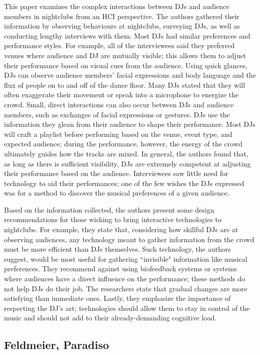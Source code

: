 This paper examines the complex interactions between DJs and audience members in nightclubs from an HCI perspective. The authors gathered their information by observing behaviours at nightclubs, surveying DJs, as well as conducting lengthy interviews with them. Most DJs had similar preferences and performance styles. For example, all of the interviewees said they preferred venues where audience and DJ are mutually visible; this allows them to adjust their performance based on visual cues from the audience. Using quick glances, DJs can observe audience members' facial expressions and body language and the flux of people on to and off of the dance floor. Many DJs stated that they will often exaggerate their movement or speak into a microphone to energize the crowd. Small, direct interactions can also occur between DJs and audience members, such as exchanges of facial expressions or gestures. DJs use the information they glean from their audience to shape their performance. Most DJs will craft a playlist before performing based on the venue, event type, and expected audience; during the performance, however, the energy of the crowd ultimately guides how the tracks are mixed. In general, the authors found that, as long as there is sufficient visibility, DJs are extremely competent at adjusting their performance based on the audience. Interviewees saw little need for technology to aid their performances; one of the few wishes the DJs expressed was for a method to discover the musical preferences of a given audience.

Based on the information collected, the authors present some design recommendations for those wishing to bring interactive technologies to nightclubs. For example, they state that, considering how skillful DJs are at observing audiences, any technology meant to gather information from the crowd must be more efficient than DJs themselves. Such technology, the authors suggest, would be most useful for gathering ``invisible" information like musical preferences. They recommend against using biofeedback systems or systems where audiences have a direct influence on the performance; these methods do not help DJs do their job. The researchers state that gradual changes are more satisfying than immediate ones. Lastly, they emphasize the importance of respecting the DJ's art; technologies should allow them to stay in control of the music and should not add to their already-demanding cognitive load.

\subsection{Feldmeier, Paradiso}

